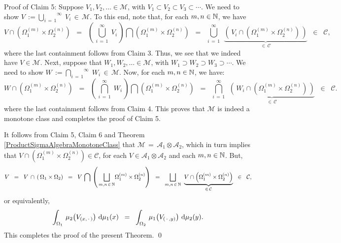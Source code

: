 \vskip 0.5cm
\noindent
Proof of Claim 5:\quad
Suppose $V_{1}, V_{2}, \ldots \in \mathcal{M}$, with $V_{1} \subset V_{2} \subset V_{3} \subset \cdots$.
We need to show $V\,:=\overset{\infty}{\underset{i\,=\,1}{\bigcup}}\;V_{i} \,\in\, \mathcal{M}$.
To this end, note that, for each $m, n \in \mathbb{N}$, we have
\begin{equation*}
V\cap\left(\Omega_{1}^{(m)}\times\Omega_{2}^{(n)}\right)
\;\;=\;\;
	\left(\,\overset{\infty}{\underset{i\,=\,1}{\bigcup}}\;V_{i}\,\right)\bigcap\left(\Omega_{1}^{(m)}\times\Omega_{2}^{(n)}\right)
\;\;=\;\;
	\overset{\infty}{\underset{i\,=\,1}{\bigcup}}\;\,
	\underset{\in\,\mathcal{C}}{\underbrace{\left(\,V_{i}\cap(\Omega_{1}^{(m)}\times\Omega_{2}^{(n)})\,\right)}}
\;\;\in\;\; \mathcal{C},
\end{equation*}
where the last containment follows from Claim 3.
Thus, we see that we indeed have $V \in \mathcal{M}$.
Next, suppose that
$W_{1}, W_{2}, \ldots \in \mathcal{M}$, with $W_{1} \supset W_{2} \supset W_{3} \supset \cdots$.
We need to show $W\,:=\overset{\infty}{\underset{i\,=\,1}{\bigcap}}\;W_{i} \,\in\, \mathcal{M}$.
Now, for each $m, n \in \mathbb{N}$, we have:
\begin{equation*}
W\cap\left(\Omega_{1}^{(m)}\times\Omega_{2}^{(n)}\right)
\;\;=\;\;
	\left(\,\overset{\infty}{\underset{i\,=\,1}{\bigcap}}\;W_{i}\,\right)\bigcap\left(\Omega_{1}^{(m)}\times\Omega_{2}^{(n)}\right)
\;\;=\;\;
	\overset{\infty}{\underset{i\,=\,1}{\bigcap}}\;\,
	\underset{\in\,\mathcal{C}}{\underbrace{\left(\,W_{i}\cap(\Omega_{1}^{(m)}\times\Omega_{2}^{(n)})\,\right)}}
\;\;\in\;\; \mathcal{C}.
\end{equation*}
where the last containment follows from Claim 4.
This proves that $\mathcal{M}$ is indeed a monotone class and completes the proof of Claim 5.

\vskip 0.5cm
\noindent
It follows from Claim 5, Claim 6 and Theorem \ref{ProductSigmaAlgebraMonotoneClass}
that $\mathcal{M} \,=\, \mathcal{A}_{1}\otimes\mathcal{A}_{2}$, which in turn implies that
$V\cap\left(\Omega_{1}^{(m)}\times\Omega_{2}^{(n)}\right) \in \mathcal{C}$, for each
$V \in \mathcal{A}_{1}\otimes\mathcal{A}_{2}$ and each $m, n \in \mathbb{N}$.
But,
\begin{equation*}
V
\;\; = \;\;
	V \,\cap\, \left(\,\Omega_{1}\times\Omega_{2}\right)
\;\; = \;\;
	V \,\bigcap\, \left(\,\underset{m,n\,\in\,\mathbb{N}}{\bigsqcup}\Omega_{1}^{(m)}\times\Omega_{2}^{(n)}\right)
\;\; = \;\;
	\underset{m,n\,\in\,\mathbb{N}}{\bigsqcup}\;\;
	\underset{\in\,\mathcal{C}}{\underbrace{V\cap\left(\Omega_{1}^{(m)}\times\Omega_{2}^{(n)}\right)}}
\;\; \in \;\;
	\mathcal{C},
\end{equation*}
or equivalently,
\begin{equation*}
\int_{\Omega_{1}}\, \mu_{2}\!\left(V_{(x,\,\cdot\,)}\right) \,\textnormal{d}\mu_{1}(x)
\;\; = \;\;
\int_{\Omega_{2}}\, \mu_{1}\!\left(V_{(\,\cdot\,,y)}\right) \,\textnormal{d}\mu_{2}(y).
\end{equation*}
This completes the proof of the present Theorem.
\qed


\renewcommand{\theenumi}{\roman{enumi}}
\renewcommand{\labelenumi}{\textnormal{(\theenumi)}$\;\;$}

